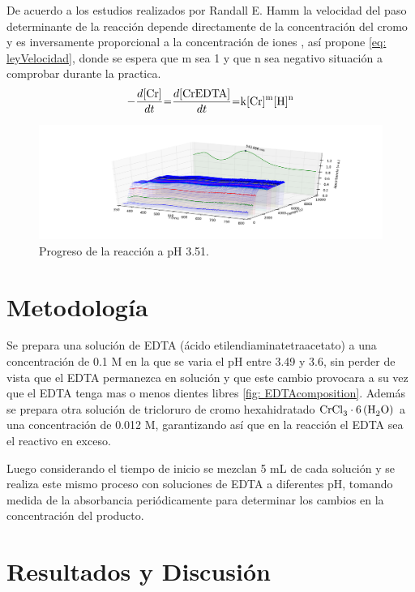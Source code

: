 \documentclass[fleqn,10pt]{SelfArx} %
\begin{document}
	De acuerdo a los estudios realizados por Randall E. Hamm \cite{Hamm} la velocidad del paso determinante de la reacción depende directamente de la concentración del cromo y es inversamente proporcional a la concentración de iones \ce{[H^+]}, así propone \autoref{eq: leyVelocidad}, donde se espera que m sea 1 y que n sea negativo situación a comprobar durante la practica.
	\begin{equation}
	\label{eq: leyVelocidad}
	    \ce{-\dfrac{d\ce{[Cr]}}{dt}=\dfrac{d\ce{[CrEDTA]}}{dt}=k\ce{[Cr]}^m\ce{[H]}^n}
	\end{equation}
	
	\begin{figure}[!ht]
	    \centering
	    \includegraphics[width=\linewidth]{images/3dplot.pdf}
	    \caption{Progreso de la reacci\'on a pH 3.51.}
	    \label{fig: 3dProgress}
	\end{figure}

	\section{Metodolog\'ia}
	Se prepara una solución de EDTA (ácido etilendiaminatetraacetato) a una concentración de 0.1 M en la que se varia el pH entre 3.49 y 3.6, sin perder de vista que el EDTA permanezca en solución y que este cambio provocara a su vez que el EDTA tenga mas o menos dientes libres \autoref{fig: EDTAcomposition}. Además se prepara otra solución de tricloruro de cromo hexahidratado $\ce{CrCl_{3}} \cdot \ce{6(H_{2}O)}$ a una concentración de 0.012 M, garantizando así que en la reacción el EDTA sea el reactivo en exceso.
	
	Luego considerando el tiempo de inicio se mezclan 5 mL de cada solución y se realiza este mismo proceso con soluciones de EDTA a diferentes pH, tomando medida de la absorbancia periódicamente para determinar los cambios en la concentración del producto. 

	\section{Resultados y Discusi\'on}
	
\end{document}

